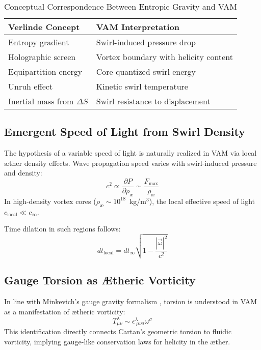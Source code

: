 \documentclass[11pt]{article}
\begin{document}
    \begin{table}[H]
        \centering
        \footnotesize
        \caption{Conceptual Correspondence Between Entropic Gravity and VAM}
        \begin{tabular}{|l|l|}
            \hline
            \textbf{Verlinde Concept} & \textbf{VAM Interpretation} \\
            \hline
            Entropy gradient & Swirl-induced pressure drop \\
            Holographic screen & Vortex boundary with helicity content \\
            Equipartition energy & Core quantized swirl energy \\
            Unruh effect & Kinetic swirl temperature \\
            Inertial mass from $\Delta S$ & Swirl resistance to displacement \\
            \hline
        \end{tabular}
    \end{table}

    \subsection*{Emergent Speed of Light from Swirl Density}

    The hypothesis of a variable speed of light \cite{popescu2008cvar} is naturally realized in VAM via local æther density effects. Wave propagation speed varies with swirl-induced pressure and density:
    \[
        c^2 \propto \frac{\partial P}{\partial \rho_{\text{\ae}}} \sim \frac{F_\text{max}}{\rho_{\text{\ae}}}
    \]
    In high-density vortex cores ($\rho_{\text{\ae}} \sim 10^{18}$~kg/m$^3$), the local effective speed of light $c_\text{local} \ll c_\infty$.

    Time dilation in such regions follows:
    \[
        dt_\text{local} = dt_\infty \sqrt{1 - \frac{|\vec{\omega}|^2}{c^2}}
    \]

    \subsection*{Gauge Torsion as Ætheric Vorticity}

    In line with Minkevich’s gauge gravity formalism \cite{minkevich2008gauge}, torsion is understood in VAM as a manifestation of ætheric vorticity:
    \[
        T^\lambda_{\mu\nu} \sim \epsilon^{\lambda}_{\ \mu\nu\sigma} \omega^\sigma
    \]
    This identification directly connects Cartan's geometric torsion to fluidic vorticity, implying gauge-like conservation laws for helicity in the æther.
\end{document}
